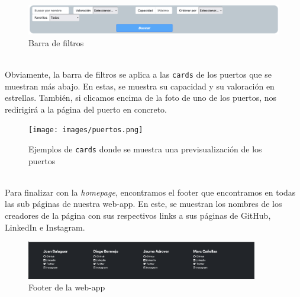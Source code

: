 \documentclass{article}
\begin{document}
\begin{figure}[ht]
    \centering
    \includegraphics[width=1.0\textwidth]{images/filtros.png}
    \caption{Barra de filtros}
\end{figure}
\\Obviamente, la barra de filtros se aplica a las \texttt{cards} de los puertos que se muestran más abajo. En estas, se muestra su capacidad y su valoración en estrellas. También, si clicamos encima de la foto de uno de los puertos, nos redirigirá a la página del puerto en concreto.
\begin{figure}[ht]
    \centering
    \texttt{[image: images/puertos.png]}
    \caption{Ejemplos de \texttt{cards} donde se muestra una previsualización de los puertos}
\end{figure}
\\Para finalizar con la \textit{homepage}, encontramos el footer que encontramos en todas las sub páginas de nuestra web-app. En este, se muestran los nombres de los creadores de la página con sus respectivos links a sus páginas de GitHub, LinkedIn e Instagram.
\begin{figure}[ht]
    \centering
    \includegraphics[width=0.9\textwidth]{images/footer.png}
    \caption{Footer de la web-app}
\end{figure}
\newpage
\end{document}
